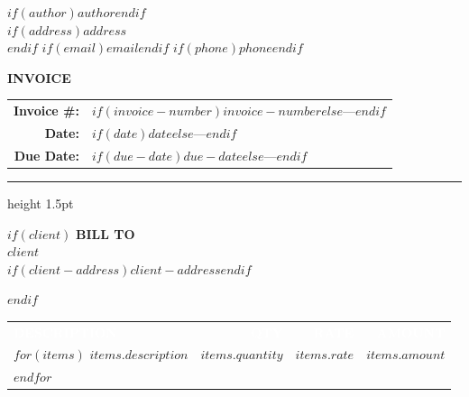 \documentclass[11pt,letterpaper]{article}
\newcommand{\sep}{\enspace{\color{rulecolor}\textbullet}\enspace}
\begin{document}
\noindent
\begin{minipage}[t]{0.55\textwidth}
  \raggedright
  {\large\bfseries\color{headercolor} $if(author)$$author$$endif$}\\[0.3em]
  {\small\color{black}
    $if(address)$$address$\\$endif$
    $if(email)$\href{mailto:$email$}{$email$}$endif$%
    $if(phone)$\sep$phone$$endif$%
  }
\end{minipage}%
\hfill
\begin{minipage}[t]{0.4\textwidth}
  \raggedleft
  {\LARGE\bfseries\color{accentcolor} INVOICE}\\[0.4em]
  {\small
    \begin{tabular}{r l}
      \textbf{Invoice \#:} & $if(invoice-number)$$invoice-number$$else$—$endif$ \\
      \textbf{Date:}       & $if(date)$$date$$else$—$endif$ \\
      \textbf{Due Date:}   & $if(due-date)$$due-date$$else$—$endif$ \\
    \end{tabular}
  }
\end{minipage}

\vspace{0.5em}
{\color{rulecolor}\hrule height 1.5pt}
\vspace{1em}

$if(client)$
\noindent\textbf{\small BILL TO}\\[0.2em]
{\normalsize\bfseries $client$}\\
{\small $if(client-address)$$client-address$$endif$}

\vspace{1em}
$endif$

\renewcommand{\arraystretch}{1.4}
\noindent
\begin{tabularx}{\textwidth}{X r r r}
  \rowcolor{tableheaderbg}
  \textcolor{white}{\textbf{\small DESCRIPTION}} &
  \textcolor{white}{\textbf{\small QTY}} &
  \textcolor{white}{\textbf{\small RATE}} &
  \textcolor{white}{\textbf{\small AMOUNT}} \\
  $for(items)$
  $items.description$ & $items.quantity$ & $items.rate$ & $items.amount$ \\
  $endfor$
\end{tabularx}
\end{document}
